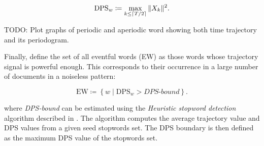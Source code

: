 \begin{equation}
	\text{DPS}_{w} \coloneqq \max\limits_{k \leq \lceil T / 2\rceil}{\|X_{k}\|^{2}}.
\end{equation}

{\color{red} TODO: Plot graphs of periodic and aperiodic word showing both time trajectory and its periodogram.}

Finally, \cite{event-detection} define the set of all eventful words (EW) as those words whose trajectory signal is powerful enough. This corresponds to their occurrence in a large number of documents in a noiseless pattern:

\begin{equation}
	\text{EW} \coloneqq \left\{ w \mid \text{DPS}_{w} > \textit{DPS-bound} \right\}.
\end{equation}

where \textit{DPS-bound} can be estimated using the \textit{Heuristic stopword detection} algorithm described in \cite{event-detection}. The algorithm computes the average trajectory value and DPS values from a given seed stopwords set. The DPS boundary is then defined as the maximum DPS value of the stopwords set.